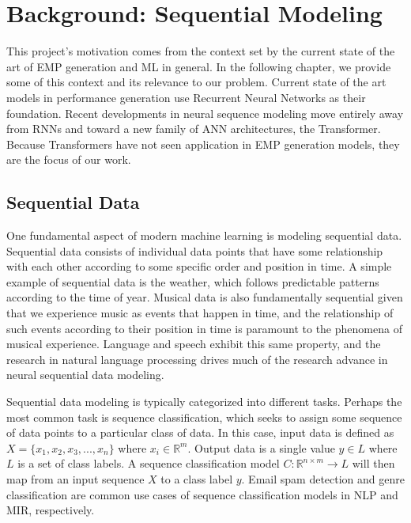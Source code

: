 \chapter{Background: Sequential Modeling}\label{ch:ch3}

This project's motivation comes from the context set by the current state of the art of EMP generation and ML in general. In the following chapter, we provide some of this context and its relevance to our problem.  Current state of the art models in performance generation use Recurrent Neural Networks as their foundation. Recent developments in neural sequence modeling move entirely away from RNNs and toward a new family of ANN architectures, the Transformer. Because Transformers have not seen application in EMP generation models, they are the focus of our work. 

\section{Sequential Data}\label{sec:sequential-data}
One fundamental aspect of modern machine learning is modeling sequential data. Sequential data consists of individual data points that have some relationship with each other according to some specific order and position in time. A simple example of sequential data is the weather, which follows predictable patterns according to the time of year. Musical data is also fundamentally sequential\cite{widmer2016getting} given that we experience music as events that happen in time, and the relationship of such events according to their position in time is paramount to the phenomena of musical experience. Language and speech exhibit this same property, and the research in natural language processing drives much of the research advance in neural sequential data modeling. 

Sequential data modeling is typically categorized into different tasks. Perhaps the most common task is sequence classification, which seeks to assign some sequence of data points to a particular class of data. In this case, input data is defined as $X = \{x_1, x_2, x_3, ..., x_n\}$ where $x_i \in \mathbb{R}^m$. Output data is a single value $y \in L$ where $L$ is a set of class labels. A sequence classification model $C: \mathbb{R}^{n \times m} \rightarrow L$ will then map from an input sequence $X$ to a class label $y$. Email spam detection and genre classification are common use cases of sequence classification models in NLP and MIR, respectively. 

\newcommand{\seq}{\emph{seq2seq}}

